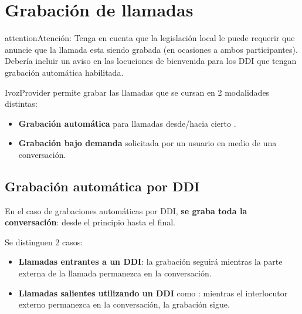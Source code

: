 \documentclass[letterpaper,10pt,spanish]{sphinxmanual}
\begin{document}
\section{Grabación de llamadas}
\label{pbx_features/call_recording:call-recording}\label{pbx_features/call_recording::doc}\label{pbx_features/call_recording:call-recordings}
\begin{notice}{attention}{Atención:}
Tenga en cuenta que la legislación local le puede requerir que anuncie que la llamada esta siendo grabada (en ocasiones a ambos participantes). Debería incluir un aviso en las locuciones de bienvenida para los DDI que tengan grabación automática habilitada.
\end{notice}

IvozProvider permite grabar las llamadas que se cursan en 2 modalidades distintas:
\begin{itemize}
\item {} 
\textbf{Grabación automática} para llamadas desde/hacia cierto {\hyperref[pbx_features/external_ddis:external\string-ddis]{}}.

\item {} 
\textbf{Grabación bajo demanda} solicitada por un usuario en medio de una conversación.

\end{itemize}


\subsection{Grabación automática por DDI}
\label{pbx_features/call_recording:automatic-ddi-recordings}
En el caso de grabaciones automáticas por DDI, \textbf{se graba toda la conversación}: desde el principio hasta el final.

Se distinguen 2 casos:
\begin{itemize}
\item {} 
\textbf{Llamadas entrantes a un DDI}: la grabación seguirá mientras la parte externa de la llamada permanezca en la conversación.

\item {} 
\textbf{Llamadas salientes utilizando un DDI} como {\hyperref[pbx_features/external_ddis:external\string-ddis]{}}: mientras el interlocutor externo permanezca en la conversación, la grabación sigue.

\end{itemize}
\end{document}
